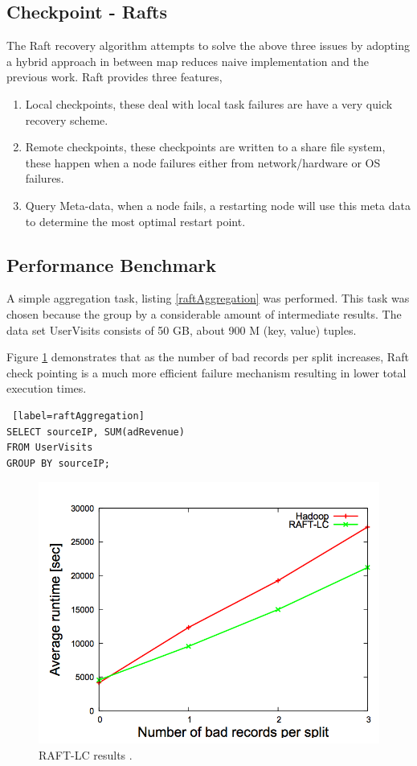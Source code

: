 \documentclass[10pt,twocolumn]{IEEEtran11}
\begin{document}
\subsection{Checkpoint - Rafts}

The Raft recovery algorithm attempts to solve the above three issues by adopting a hybrid approach in between map reduces naive implementation and the previous work.  Raft provides three features,

\begin{enumerate}
	\item Local checkpoints, these deal with local task failures are have a very quick recovery scheme.
	\item Remote checkpoints, these checkpoints are written to a share file system, these happen when a node failures either from network/hardware or OS failures.
	\item Query Meta-data, when a node fails, a restarting node will use this meta data to determine the most optimal restart point.
\end{enumerate}


\subsection{Performance Benchmark}
A simple aggregation task, listing \ref{raftAggregation} was performed.  This task was chosen because the group by a considerable amount of intermediate results.  The data set UserVisits consists of 50 GB, about 900 M (key, value) tuples.
\par
Figure \ref{fig:raftPerformance} demonstrates that as the number of bad records per split increases, Raft check pointing is a much more efficient failure mechanism resulting in lower total execution times. 

\begin{lstlisting} [label=raftAggregation]
SELECT sourceIP, SUM(adRevenue)
FROM UserVisits
GROUP BY sourceIP;
\end{lstlisting}

\begin{figure}[h]
	\centering
	\includegraphics[scale=0.6]{images/raftBenchmark.png}
	\caption{ RAFT-LC results \protect\cite{quiane2011rafting}.}
	\label{fig:raftPerformance}
\end{figure}
\end{document}
